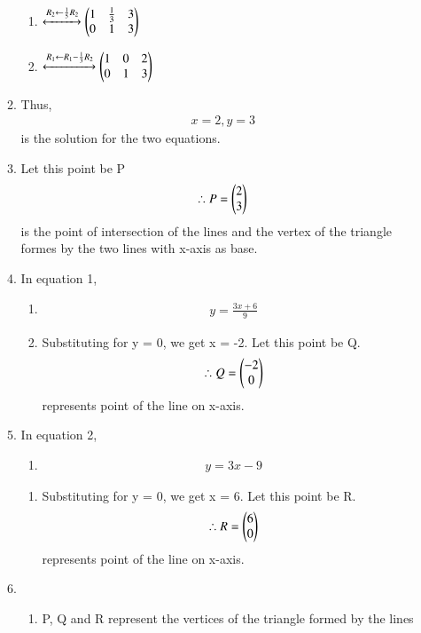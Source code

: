 \documentclass[journal,12pt,twocolumn]{IEEEtran}
\renewcommand\thesection{\arabic{section}}
\begin{document}
\begin{enumerate}[label=\thesection.\arabic*.,ref=\thesection.\theenumi]
\begin{enumerate}
\begin{enumerate}
    \item $\xleftrightarrow{R_2\leftarrow \frac{1}{5}R_2}
    \begin{pmatrix}1&\frac{1}{3}&3\\0&1&3\end{pmatrix}\\$
    \item $\xleftrightarrow{R_1\leftarrow R_1-\frac{1}{3}R_2}
    \begin{pmatrix}1&0&2\\0&1&3\end{pmatrix}$
\end{enumerate}
\item Thus,
\begin{align}
    x=2, y=3
\end{align} 
is the solution for the two equations. 
\item  Let this point be P
\begin{align}
\therefore P=\begin{pmatrix}2\\3\end{pmatrix}
\end{align}
is the point of intersection of the lines and the vertex of the triangle formes by the two lines with x-axis as base.
\item In equation 1,
\begin{enumerate}
    \item \begin{align}
    y=\frac{3x+6}{9}
\end{align}
\item Substituting for y = 0, we get x = -2.
Let this point be Q.
\begin{align}
    \therefore Q=\begin{pmatrix}-2\\0\end{pmatrix}
\end{align}
represents point of the line on x-axis.
\end{enumerate}
\item In equation 2,
\begin{enumerate}
    \item \begin{align}
    y=3x-9
\end{align}
\end{enumerate}
\begin{enumerate}
    \item Substituting for y = 0, we get x = 6.
    Let this point be R.
\begin{align}
    \therefore R=\begin{pmatrix}6\\0\end{pmatrix}
\end{align}
represents point of the line on x-axis.
\end{enumerate}
\item 
\begin{enumerate}
    \item P, Q and R represent the vertices of the triangle formed by the lines 

\end{enumerate}
\end{enumerate}
\end{enumerate}
\end{document}
